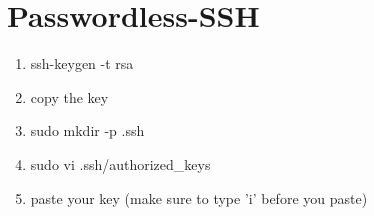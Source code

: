\section{Passwordless-SSH}

\begin{enumerate}
\item ssh-keygen -t rsa
\item copy the key
\item sudo mkdir -p .ssh
\item sudo vi .ssh/authorized_keys
\item paste your key (make sure to type 'i' before you paste)
\end{enumerate}
